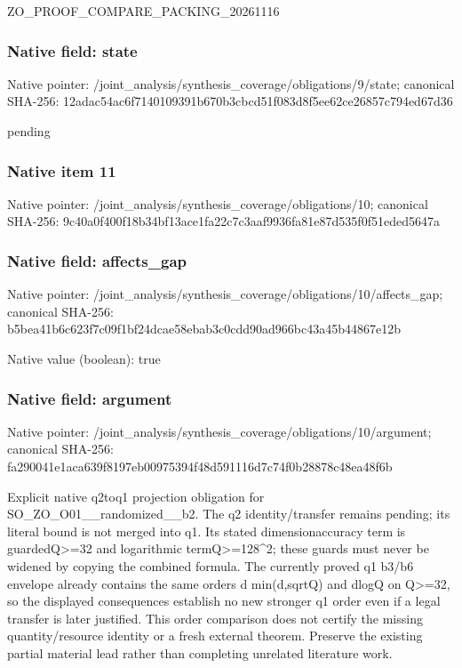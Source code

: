 \documentclass[10pt,a4paper]{article}
\begin{document}
ZO\_PROOF\_COMPARE\_PACKING\_20261116


\subsubsection{Native field: state}


Native pointer: /joint\_analysis/synthesi\allowbreak{}s\_coverage/obligations/9\allowbreak{}/state; canonical SHA-256: 12adac54ac6f7140109391b6\allowbreak{}70b3cbcd51f083d8f5ee62ce\allowbreak{}26857c794ed67d36


pending


\subsubsection{Native item 11}


Native pointer: /joint\_analysis/synthesi\allowbreak{}s\_coverage/obligations/1\allowbreak{}0; canonical SHA-256: 9c40a0f400f18b34bf13ace1\allowbreak{}fa22c7c3aaf9936fa81e87d5\allowbreak{}35f0f51eded5647a



\subsubsection{Native field: affects\_gap}


Native pointer: /joint\_analysis/synthesi\allowbreak{}s\_coverage/obligations/1\allowbreak{}0/affects\_gap; canonical SHA-256: b5bea41b6c623f7c09f1bf24\allowbreak{}dcae58ebab3c0cdd90ad966b\allowbreak{}c43a45b44867e12b



Native value (boolean): true



\subsubsection{Native field: argument}


Native pointer: /joint\_analysis/synthesi\allowbreak{}s\_coverage/obligations/1\allowbreak{}0/argument; canonical SHA-256: fa290041e1aca639f8197eb0\allowbreak{}0975394f48d591116d7c74f0\allowbreak{}b28878c48ea48f6b


Explicit native q2toq1 projection obligation for SO\_ZO\_O01\_\_randomized\_\_b2. The q2 identity/transfer remains pending; its literal bound is not merged into q1. Its stated dimensionaccuracy term is guardedQ>=32 and logarithmic termQ>=128\textasciicircum{}2; these guards must never be widened by copying the combined formula. The currently proved q1 b3/b6 envelope already contains the same orders d min(d,sqrtQ) and dlogQ on Q>=32, so the displayed consequences establish no new stronger q1 order even if a legal transfer is later justified. This order comparison does not certify the missing quantity/resource identity or a fresh external theorem. Preserve the existing partial material lead rather than completing unrelated literature work.
\end{document}
